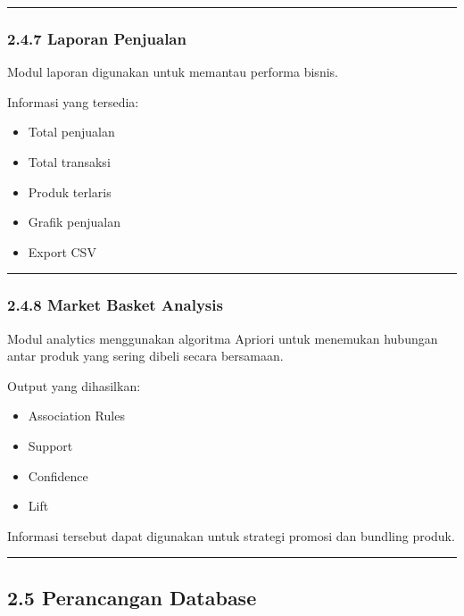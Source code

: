 \begin{center}\rule{0.5\linewidth}{0.5pt}\end{center}

\subsubsection{2.4.7 Laporan Penjualan}\label{laporan-penjualan}

Modul laporan digunakan untuk memantau performa bisnis.

Informasi yang tersedia:

\begin{itemize}
\tightlist
\item
  Total penjualan
\item
  Total transaksi
\item
  Produk terlaris
\item
  Grafik penjualan
\item
  Export CSV
\end{itemize}

\begin{center}\rule{0.5\linewidth}{0.5pt}\end{center}

\subsubsection{2.4.8 Market Basket Analysis}\label{market-basket-analysis}

Modul analytics menggunakan algoritma Apriori untuk menemukan hubungan antar produk yang sering dibeli secara bersamaan.

Output yang dihasilkan:

\begin{itemize}
\tightlist
\item
  Association Rules
\item
  Support
\item
  Confidence
\item
  Lift
\end{itemize}

Informasi tersebut dapat digunakan untuk strategi promosi dan bundling produk.

\begin{center}\rule{0.5\linewidth}{0.5pt}\end{center}

\subsection{2.5 Perancangan Database}\label{perancangan-database}

